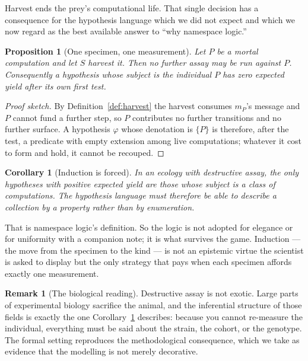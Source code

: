 \documentclass[11pt]{article}
\theoremstyle{plain}
\newtheorem{proposition}[theorem]{Proposition}
\newtheorem{corollary}[theorem]{Corollary}
\theoremstyle{definition}
\newtheorem{remark}[theorem]{Remark}
\begin{document}
Harvest ends the prey's computational life. That single decision has a consequence for the hypothesis
language which we did not expect and which we now regard as the best available answer to ``why
namespace logic.''

\begin{proposition}[One specimen, one measurement]
\label{prop:onespecimen}
Let $P$ be a mortal computation and let $S$ harvest it. Then no further assay may be run against $P$.
Consequently a hypothesis whose subject is the individual $P$ has zero expected yield after its own
first test.
\end{proposition}

\begin{proof}[Proof sketch]
By Definition~\ref{def:harvest} the harvest consumes $m_P$'s message and $P$ cannot fund a further
step, so $P$ contributes no further transitions and no further surface. A hypothesis $\varphi$ whose
denotation is $\{P\}$ is therefore, after the test, a predicate with empty extension among live
computations; whatever it cost to form and hold, it cannot be recouped.
\end{proof}

\begin{corollary}[Induction is forced]
\label{cor:induction}
In an ecology with destructive assay, the only hypotheses with positive expected yield are those whose
subject is a \emph{class} of computations. The hypothesis language must therefore be able to describe
a collection by a property rather than by enumeration.
\end{corollary}

That is namespace logic's definition. So the logic is not adopted for elegance or for uniformity with
a companion note; it is what survives the game. Induction --- the move from the specimen to the kind
--- is not an epistemic virtue the scientist is asked to display but the only strategy that pays when
each specimen affords exactly one measurement.

\begin{remark}[The biological reading]
Destructive assay is not exotic. Large parts of experimental biology sacrifice the animal, and the
inferential structure of those fields is exactly the one Corollary~\ref{cor:induction} describes:
because you cannot re-measure the individual, everything must be said about the strain, the cohort, or
the genotype. The formal setting reproduces the methodological consequence, which we take as evidence
that the modelling is not merely decorative.
\end{remark}
\end{document}
